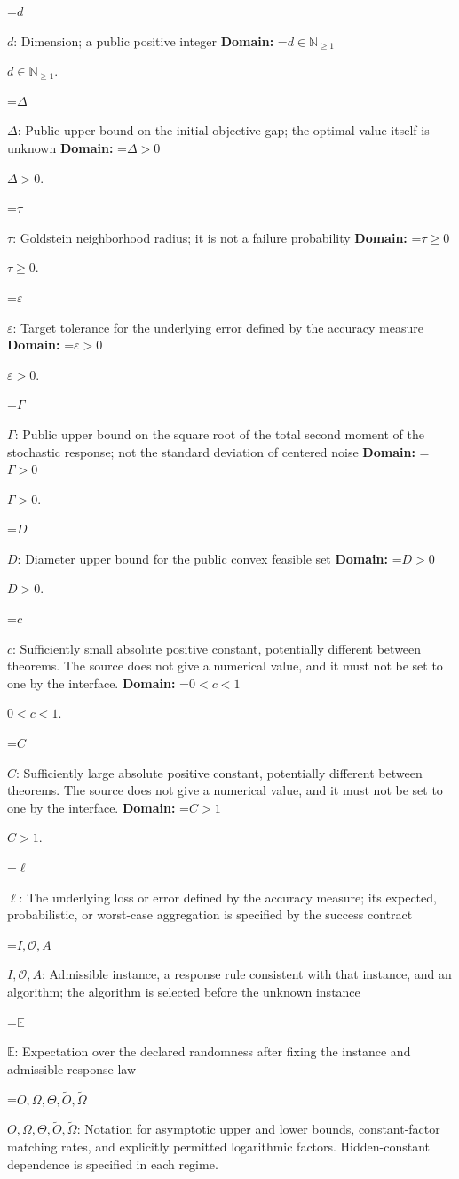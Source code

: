 \documentclass[10pt,a4paper]{article}
\newcommand{\AtlasMath}[1]{\par\begingroup\centering\setbox0=\hbox{$\displaystyle #1$}\ifdim\wd0>1.4\linewidth\typeout{ATLAS WIDE FORMULA: \the\wd0}\fi\ifdim\wd0>\linewidth\resizebox{\linewidth}{!}{\box0}\else\box0\fi\par\endgroup}
\newcommand{\AtlasInlineMath}[1]{\begingroup\setbox0=\hbox{$#1$}\ifdim\wd0>.4\linewidth\endgroup\AtlasMath{#1}\else\endgroup$#1$\fi}
\begin{document}
\AtlasInlineMath{d}: Dimension; a public positive integer \textbf{Domain:} \AtlasInlineMath{d\in\mathbb{N}_{\ge1}}.

\AtlasInlineMath{\Delta}: Public upper bound on the initial objective gap; the optimal value itself is unknown \textbf{Domain:} \AtlasInlineMath{\Delta>0}.

\AtlasInlineMath{\tau}: Goldstein neighborhood radius; it is not a failure probability \textbf{Domain:} \AtlasInlineMath{\tau\ge0}.

\AtlasInlineMath{\varepsilon}: Target tolerance for the underlying error defined by the accuracy measure \textbf{Domain:} \AtlasInlineMath{\varepsilon>0}.

\AtlasInlineMath{\Gamma}: Public upper bound on the square root of the total second moment of the stochastic response; not the standard deviation of centered noise \textbf{Domain:} \AtlasInlineMath{\Gamma>0}.

\AtlasInlineMath{D}: Diameter upper bound for the public convex feasible set \textbf{Domain:} \AtlasInlineMath{D>0}.

\AtlasInlineMath{c}: Sufficiently small absolute positive constant, potentially different between theorems. The source does not give a numerical value, and it must not be set to one by the interface. \textbf{Domain:} \AtlasInlineMath{0<c<1}.

\AtlasInlineMath{C}: Sufficiently large absolute positive constant, potentially different between theorems. The source does not give a numerical value, and it must not be set to one by the interface. \textbf{Domain:} \AtlasInlineMath{C>1}.

\AtlasInlineMath{\ell}: The underlying loss or error defined by the accuracy measure; its expected, probabilistic, or worst-case aggregation is specified by the success contract

\AtlasInlineMath{I,\mathcal{O},A}: Admissible instance, a response rule consistent with that instance, and an algorithm; the algorithm is selected before the unknown instance

\AtlasInlineMath{\mathbb{E}}: Expectation over the declared randomness after fixing the instance and admissible response law

\AtlasInlineMath{O,\Omega,\Theta,\widetilde{O},\widetilde\Omega}: Notation for asymptotic upper and lower bounds, constant-factor matching rates, and explicitly permitted logarithmic factors. Hidden-constant dependence is specified in each regime.
\end{document}
